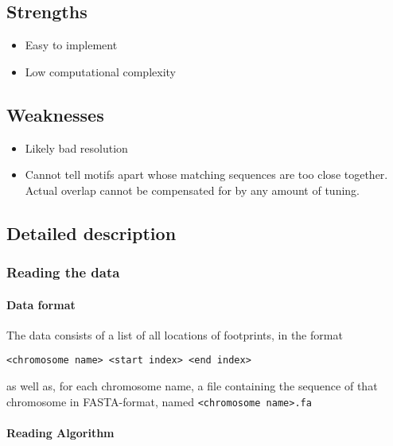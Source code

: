 \documentclass[fleqn]{book}
\providecommand{\tightlist}{%
  \setlength{\itemsep}{0pt}\setlength{\parskip}{0pt}}
\let\oldparagraph\paragraph
\renewcommand{\paragraph}[1]{\oldparagraph{#1}\mbox{}}
\begin{document}
\subsection{Strengths}\label{strengths}

\begin{itemize}
\tightlist
\item
  Easy to implement
\item
  Low computational complexity
\end{itemize}

\subsection{Weaknesses}\label{weaknesses}

\begin{itemize}
\tightlist
\item
  Likely bad resolution
\item
  Cannot tell motifs apart whose matching sequences are too close
  together. Actual overlap cannot be compensated for by any amount of
  tuning.
\end{itemize}

\subsection{Detailed description}\label{detailed-description}

\subsubsection{Reading the data}\label{reading-the-data}

\paragraph{Data format}\label{data-format-1}

The data consists of a list of all locations of footprints, in the
format

\begin{verbatim}
<chromosome name> <start index> <end index>
\end{verbatim}

as well as, for each chromosome name, a file containing the sequence of
that chromosome in FASTA-format, named
\texttt{\textless{}chromosome\ name\textgreater{}.fa}

\paragraph{Reading Algorithm}\label{reading-algorithm}
\end{document}
